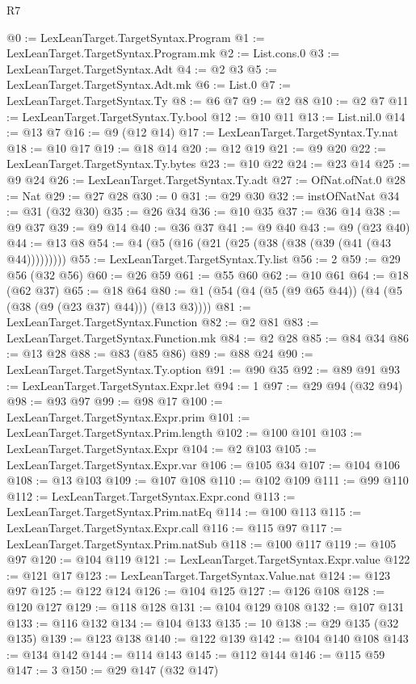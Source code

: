 \begin{lexlean}{R7}
\begin{coremodule}
@0 := LexLeanTarget.TargetSyntax.Program
@1 := LexLeanTarget.TargetSyntax.Program.mk
@2 := List.cons.{0}
@3 := LexLeanTarget.TargetSyntax.Adt
@4 := @2 @3
@5 := LexLeanTarget.TargetSyntax.Adt.mk
@6 := List.{0}
@7 := LexLeanTarget.TargetSyntax.Ty
@8 := @6 @7
@9 := @2 @8
@10 := @2 @7
@11 := LexLeanTarget.TargetSyntax.Ty.bool
@12 := @10 @11
@13 := List.nil.{0}
@14 := @13 @7
@16 := @9 (@12 @14)
@17 := LexLeanTarget.TargetSyntax.Ty.nat
@18 := @10 @17
@19 := @18 @14
@20 := @12 @19
@21 := @9 @20
@22 := LexLeanTarget.TargetSyntax.Ty.bytes
@23 := @10 @22
@24 := @23 @14
@25 := @9 @24
@26 := LexLeanTarget.TargetSyntax.Ty.adt
@27 := OfNat.ofNat.{0}
@28 := Nat
@29 := @27 @28
@30 := 0
@31 := @29 @30
@32 := instOfNatNat
@34 := @31 (@32 @30)
@35 := @26 @34
@36 := @10 @35
@37 := @36 @14
@38 := @9 @37
@39 := @9 @14
@40 := @36 @37
@41 := @9 @40
@43 := @9 (@23 @40)
@44 := @13 @8
@54 := @4 (@5 (@16 (@21 (@25 (@38 (@38 (@39 (@41 (@43 @44)))))))))
@55 := LexLeanTarget.TargetSyntax.Ty.list
@56 := 2
@59 := @29 @56 (@32 @56)
@60 := @26 @59
@61 := @55 @60
@62 := @10 @61
@64 := @18 (@62 @37)
@65 := @18 @64
@80 := @1 (@54 (@4 (@5 (@9 @65 @44)) (@4 (@5 (@38 (@9 (@23 @37) @44))) (@13 @3))))
@81 := LexLeanTarget.TargetSyntax.Function
@82 := @2 @81
@83 := LexLeanTarget.TargetSyntax.Function.mk
@84 := @2 @28
@85 := @84 @34
@86 := @13 @28
@88 := @83 (@85 @86)
@89 := @88 @24
@90 := LexLeanTarget.TargetSyntax.Ty.option
@91 := @90 @35
@92 := @89 @91
@93 := LexLeanTarget.TargetSyntax.Expr.let
@94 := 1
@97 := @29 @94 (@32 @94)
@98 := @93 @97
@99 := @98 @17
@100 := LexLeanTarget.TargetSyntax.Expr.prim
@101 := LexLeanTarget.TargetSyntax.Prim.length
@102 := @100 @101
@103 := LexLeanTarget.TargetSyntax.Expr
@104 := @2 @103
@105 := LexLeanTarget.TargetSyntax.Expr.var
@106 := @105 @34
@107 := @104 @106
@108 := @13 @103
@109 := @107 @108
@110 := @102 @109
@111 := @99 @110
@112 := LexLeanTarget.TargetSyntax.Expr.cond
@113 := LexLeanTarget.TargetSyntax.Prim.natEq
@114 := @100 @113
@115 := LexLeanTarget.TargetSyntax.Expr.call
@116 := @115 @97
@117 := LexLeanTarget.TargetSyntax.Prim.natSub
@118 := @100 @117
@119 := @105 @97
@120 := @104 @119
@121 := LexLeanTarget.TargetSyntax.Expr.value
@122 := @121 @17
@123 := LexLeanTarget.TargetSyntax.Value.nat
@124 := @123 @97
@125 := @122 @124
@126 := @104 @125
@127 := @126 @108
@128 := @120 @127
@129 := @118 @128
@131 := @104 @129 @108
@132 := @107 @131
@133 := @116 @132
@134 := @104 @133
@135 := 10
@138 := @29 @135 (@32 @135)
@139 := @123 @138
@140 := @122 @139
@142 := @104 @140 @108
@143 := @134 @142
@144 := @114 @143
@145 := @112 @144
@146 := @115 @59
@147 := 3
@150 := @29 @147 (@32 @147)

\end{coremodule}
\end{lexlean}
